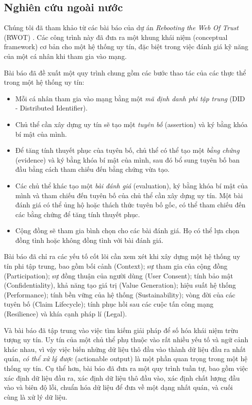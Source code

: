 \subsection{Nghiên cứu ngoài nước}

Chúng tôi đã tham khảo từ các bài báo của dự án \textit{Rebooting the Web Of Trust} (RWOT) \cite{reputation-toolkit, reputation-design, reputation-interpretation}.
Các công trình này đã đưa ra một khung khái niệm (conceptual framework) cơ bản cho một hệ thống uy tín, đặc biệt trong việc đánh giá kỹ năng của một cá nhân khi tham gia vào mạng.

Bài báo \cite{reputation-toolkit} đã đề xuất một quy trình chung gồm các bước thao tác của các thực thể trong một hệ thống uy tín:
\begin{itemize}
  \item Mỗi cá nhân tham gia vào mạng bằng một \textit{mã định danh phi tập trung} (DID - Distributed Identifier).
  \item Chủ thể cần xây dựng uy tín sẽ tạo một \textit{tuyên bố} (assertion) và ký bằng khóa bí mật của mình.
  \item Để tăng tính thuyết phục của tuyên bố, chủ thể có thể tạo một \textit{bằng chứng} (evidence) và ký bằng khóa bí mật của mình, sau đó bổ sung tuyên bố ban đầu bằng cách tham chiếu đến bằng chứng vừa tạo.
  \item Các chủ thể khác tạo một \textit{bài đánh giá} (evaluation), ký bằng khóa bí mật của mình và tham chiếu đến tuyên bố của chủ thể cần xây dựng uy tín. Một bài đánh giá có thể ủng hộ hoặc thách thức tuyên bố gốc, có thể tham chiếu đến các bằng chứng để tăng tính thuyết phục.
  \item Cộng đồng sẽ tham gia bình chọn cho các bài đánh giá. Họ có thể lựa chọn đồng tình hoặc không đồng tình với bài đánh giá.
\end{itemize}
Bài báo \cite{reputation-design} đã chỉ ra các yếu tố cốt lõi cần xem xét khi xây dựng một hệ thống uy tín phi tập trung, bao gồm bối cảnh (Context);
sự tham gia của cộng đồng (Participation); sự đồng thuận của người dùng (User Consent); tính bảo mật (Confidentiality), khả năng tạo giá trị (Value Generation);
hiệu suất hệ thống (Performance); tính bền vững của hệ thống (Sustainability); vòng đời của các tuyên bố (Claim Lifecycle); tính phục hồi sau các cuộc tấn công mạng (Resilience) và khía cạnh pháp lí (Legal).

Và bài báo \cite{reputation-interpretation} đã tập trung vào việc tìm kiếm giải pháp để số hóa khái niệm trừu tượng uy tín.
Uy tín của một chủ thể phụ thuộc vào rất nhiều yếu tố và ngữ cảnh khác nhau, vì vậy việc biến những dữ liệu thô đầu vào thành dữ liệu đầu ra nhất quán, \textit{có thể xử lý được} (actionable output) là một phần quan trọng trong một hệ thống uy tín. 
Cụ thể hơn, bài báo đã đưa ra một quy trình tuần tự, bao gồm việc xác định dữ liệu đầu ra, xác định dữ liệu thô đầu vào, xác định chất lượng đầu vào và biên độ lỗi, chuẩn hóa dữ liệu để đưa về một dạng nhất quán, và cuối cùng là xử lý dữ liệu.


